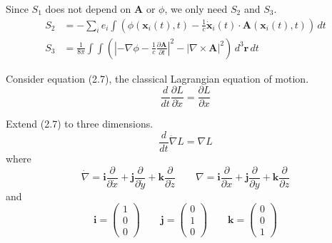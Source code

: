 


Since $S_1$ does not depend on $\mathbf A$ or $\phi$,
we only need $S_2$ and $S_3$.
\begin{align*}
S_2&=-\sum_i e_i\int\left(
\phi(\mathbf x_i(t),t)
-\frac{1}{c}\dot{\mathbf x}_i(t)\cdot\mathbf A(\mathbf x_i(t),t)
\right)
\,dt
\tag{9.25}
\\
S_3&=\frac{1}{8\pi}\int\int
\left(
\left|-\nabla\phi-\frac{1}{c}\frac{\partial\mathbf A}{\partial t}\right|^2
-\left|\nabla\times\mathbf A\right|^2
\right)
\,d^3\mathbf r\,dt
\tag{9.26}
\end{align*}

Consider equation (2.7), the classical Lagrangian equation of motion.
\begin{equation*}
\frac{d}{dt}\frac{\partial L}{\partial\dot x}=\frac{\partial L}{\partial x}
\tag{2.7}
\end{equation*}

Extend (2.7) to three dimensions.
\begin{equation*}
\frac{d}{dt}\dot\nabla L=\nabla L
\tag{1}
\end{equation*}
where
\begin{equation*}
\dot\nabla
=\mathbf i\frac{\partial}{\partial\dot x}
+\mathbf j\frac{\partial}{\partial\dot y}
+\mathbf k\frac{\partial}{\partial\dot z}
\qquad
\nabla
=\mathbf i\frac{\partial}{\partial x}
+\mathbf j\frac{\partial}{\partial y}
+\mathbf k\frac{\partial}{\partial z}
\end{equation*}
and
\begin{equation*}
\mathbf i=\begin{pmatrix}1\\0\\0\end{pmatrix}
\qquad
\mathbf j=\begin{pmatrix}0\\1\\0\end{pmatrix}
\qquad
\mathbf k=\begin{pmatrix}0\\0\\1\end{pmatrix}
\end{equation*}

